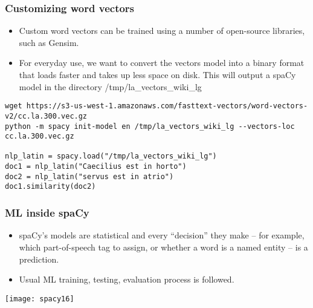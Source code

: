 \begin{frame}[fragile]\frametitle{Customizing word vectors}

\begin{itemize}
\item Custom word vectors can be trained using a number of open-source libraries, such as Gensim.
\item For everyday use, we want to convert the vectors model into a binary format that loads faster and takes up less space on disk.
This will output a spaCy model in the directory /tmp/la\_vectors\_wiki\_lg
\end{itemize}

\begin{lstlisting}
wget https://s3-us-west-1.amazonaws.com/fasttext-vectors/word-vectors-v2/cc.la.300.vec.gz
python -m spacy init-model en /tmp/la_vectors_wiki_lg --vectors-loc cc.la.300.vec.gz

nlp_latin = spacy.load("/tmp/la_vectors_wiki_lg")
doc1 = nlp_latin("Caecilius est in horto")
doc2 = nlp_latin("servus est in atrio")
doc1.similarity(doc2)
\end{lstlisting}


\end{frame}

\begin{frame}[fragile]\frametitle{ML inside spaCy}

\begin{itemize}
\item spaCy’s models are statistical and every “decision” they make – for example, which part-of-speech tag to assign, or whether a word is a named entity – is a prediction. 
\item Usual ML training, testing, evaluation process is followed.
\end{itemize}

\begin{center}
\texttt{[image: spacy16]}
\end{center}


\end{frame}